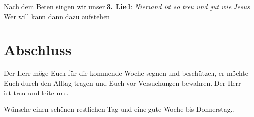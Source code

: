 \documentclass[12pt,a4paper]{scrarticle}
\begin{document}
Nach dem Beten singen wir unser \textbf{3. Lied}: \textit{Niemand ist so treu und gut wie Jesus}\\
Wer will kann dann dazu aufstehen

\section{Abschluss}

Der Herr möge Euch für die kommende Woche segnen und beschützen, er möchte Euch durch den Alltag tragen und Euch vor Versuchungen bewahren. Der Herr ist treu und leite uns.

Wünsche einen schönen restlichen Tag und eine gute Woche bis Donnerstag..
\end{document}
